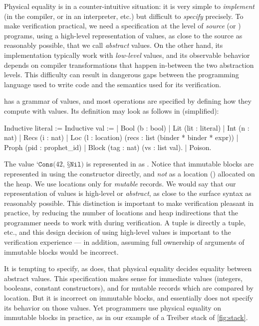Physical equality is in a counter-intuitive situation: it is very simple to \emph{implement} (in the \OCaml compiler, or in an interpreter, etc.) but difficult to \emph{specify} precisely. To make verification practical, we need a specification at the level of \emph{source} \OCaml (or \Zoo) programs, using a high-level representation of values, as close to the source as reasonably possible, that we call \emph{abstract} values. On the other hand, its implementation typically work with \emph{low-level} values, and its observable behavior depends on compiler transformations that happen in-between the two abstraction levels.
This difficulty can result in dangerous gaps between the programming language used to write code and the semantics used for its verification.

\ZooLang has a grammar of values, and most operations are specified by defining how they compute with \ZooLang values. Its definition may look as follows in \Rocq (simplified):
\begin{coqcode}
Inductive literal :=            Inductive val :=
 | Bool (b : bool)                | Lit (lit : literal)
 | Int (n : nat)                  | Recs (i : nat)
 | Loc (l : location)                    (recs : list (binder * binder * expr))
 | Proph (pid : prophet_id)       | Block (tag : nat) (vs : list val).
 | Poison.
\end{coqcode}

The value $\texttt{‘Cons(} 42 \texttt{, §Nil)}$ is represented in \Rocq as . Notice that immutable blocks are represented in \Rocq using the  constructor directly, and \emph{not} as a location () allocated on the heap. We use locations only for \emph{mutable} records. We would say that our representation of \ZooLang values is high-level or \emph{abstract}, as close to the surface syntax as reasonably possible. This distinction is important to make verification pleasant in practice, by reducing the number of locations and heap indirections that the programmer needs to work with during verification. A \ZooLang tuple is directly a tuple, etc., and this design decision of using high-level values is important to the verification experience --- in addition, assuming full ownership of arguments of immutable blocks would be incorrect.

It is tempting to specify, as \HeapLang does, that physical equality decides equality between abstract values. This specification makes sense for immediate values (integers, booleans, constant constructors), and for mutable records which are compared by location. But it is incorrect on immutable blocks, and \HeapLang essentially does not specify its behavior on those values. Yet programmers use physical equality on immutable blocks in practice, as in our example of a Treiber stack of \cref{fig:stack}.

